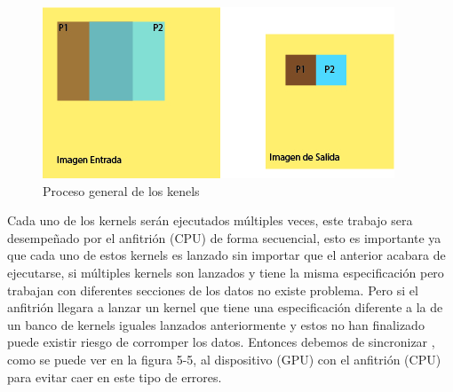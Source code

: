 \begin{figure}[ph]
			\centering
				\includegraphics[scale=1]{img/prosImg.jpg}
			\caption{Proceso general de los kenels }
\end{figure}




Cada uno de los kernels serán ejecutados múltiples veces, este trabajo sera desempeñado por el anfitrión (CPU) de forma secuencial, esto es importante ya que cada uno de estos kernels es lanzado sin importar que el anterior acabara de ejecutarse, si múltiples kernels son lanzados y tiene la misma especificación pero trabajan con diferentes secciones de los datos no existe problema. Pero si el anfitrión llegara a lanzar un kernel que tiene una especificación diferente a la de un banco de kernels iguales lanzados anteriormente y estos no han finalizado puede existir riesgo de corromper los datos. Entonces debemos de sincronizar , como se puede ver en la figura 5-5, al  dispositivo (GPU) con el anfitrión (CPU) para evitar caer en este tipo de errores.

